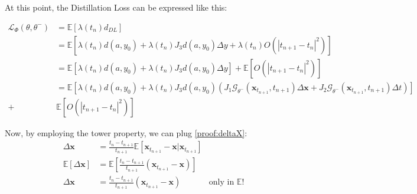 \noindent At this point, the Distillation Loss can be expressed like this:

\begin{align}
    \mathcal{L}_{\Phi}(\theta, \theta^-) &= \mathbb{E}\left[ \lambda(t_n) d_{DL}\right] \\
    & = \mathbb{E}\left[ \lambda(t_n) d(a, y_0) + \lambda(t_n) J_3 d(a, y_0) \Delta y + \lambda(t_n) O(|t_{n+1} - t_n |^2) \right] \\
    & = \mathbb{E}\left[ \lambda(t_n) d(a, y_0) + \lambda(t_n) J_3 d(a, y_0) \Delta y\right] + \mathbb{E}\left[O(|t_{n+1} - t_n |^2) \right] \\
    & = \mathbb{E}\left[ \lambda(t_n) d(a, y_0) + \lambda(t_n) J_3 d(a, y_0) (J_1\mathcal{G}_{\theta^-}(\mathbf{x}_{t_{n+1}}, t_{n+1})\Delta \mathbf{x} + J_2\mathcal{G}_{\theta^-}(\mathbf{x}_{t_{n+1}}, t_{n+1})\Delta t )\right] \\
    + & \mathbb{E}\left[O(|t_{n+1} - t_n |^2) \right] \label{proof:loss1}
\end{align}

\noindent Now, by employing the tower property, we can plug \ref{proof:deltaX}:
\begin{align}
     \Delta \mathbf{x} & = \frac{t_n - t_{n+1} }{t_{n+1}}\mathbb{E} \left[\mathbf{x}_{t_{n +1}} - \mathbf{x}| \mathbf{x}_{t_{n+1}} \right]\\
     \mathbb{E}\left[\Delta \mathbf{x} \right] &= \mathbb{E}\left[\frac{t_n - t_{n+1} }{t_{n+1}}(\mathbf{x}_{t_{n +1}} - \mathbf{x}) \right]  \\
     \Delta \mathbf{x} &= \frac{t_n - t_{n+1} }{t_{n+1}}(\mathbf{x}_{t_{n +1}} - \mathbf{x}) & \text{only in $\mathbb{E}$!} \label{proof:edeltaX}
\end{align}

